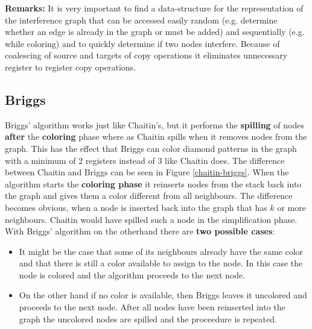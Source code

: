 \documentclass[a4paper,10pt]{article}
\begin{document}
\textbf{Remarks:} It is very important to find a data-structure for the representation of the interference graph that can be accessed easily random (e.g. determine whether an edge is already in the graph or must be added) and sequentially (e.g. while coloring) and to quickly determine if two nodes interfere. Because of coalescing of source and targets of copy operations it eliminates unnecessary register to register copy operations.

\subsection{Briggs}
Briggs' algorithm works just like Chaitin's, but it performs the \textbf{spilling} of nodes \textbf{after} the
       \textbf{coloring} phase where as Chaitin spills when it removes nodes from the graph. This has the effect that Briggs can color
       diamond patterns in the graph with a minimum of 2 registers instead of 3 like Chaitin does. The difference between Chaitin and
       Briggs can be seen in Figure \ref{chaitin-briggs}. When the algorithm starts the \textbf{coloring phase} it reinserts nodes from
       the stack back into the graph and gives them a color different from all neighbours. The difference becomes obvious, when a node is
       inserted back into the graph that has $k$ or more neighbours. Chaitin would have spilled such a node in the simplification phase.
       With Briggs' algorithm on the otherhand there are \textbf{two possible cases}:
	    \begin{itemize}
		\item It might be the case that some of its neighbours already have the same color and that there is still a color
		      available to assign to the node. In this case the node is colored and the algorithm proceeds to the next node.
		\item On the other hand if no color is available, then Briggs leaves it uncolored and proceeds to the next node. After
                      all nodes have been reinserted into the graph the uncolored nodes are spilled and the proceedure is repeated.
	    \end{itemize}
\end{document}
